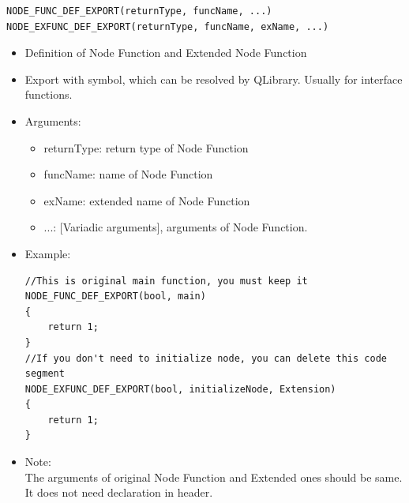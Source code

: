 \documentclass[a4paper,10pt]{book}
\begin{document}
\begin{mdframed}
\begin{verbatim}
NODE_FUNC_DEF_EXPORT(returnType, funcName, ...)
NODE_EXFUNC_DEF_EXPORT(returnType, funcName, exName, ...)
\end{verbatim}
\begin{itemize}
 \item Definition of Node Function and Extended Node Function
 \item Export with symbol, which can be resolved by QLibrary. Usually for interface functions.
 \item Arguments:
 \begin{itemize}
  \item returnType: return type of Node Function
  \item funcName: name of Node Function
  \item exName: extended name of Node Function
  \item ...: [Variadic arguments], arguments of Node Function.
 \end{itemize}
 \item Example:
 \begin{verbatim}
//This is original main function, you must keep it
NODE_FUNC_DEF_EXPORT(bool, main)
{
    return 1;
}
//If you don't need to initialize node, you can delete this code segment
NODE_EXFUNC_DEF_EXPORT(bool, initializeNode, Extension)
{
    return 1;
}
 \end{verbatim}
 \item Note: \\ The arguments of original Node Function and Extended ones should be same. \\ It does not need declaration in header.
\end{itemize}
\end{mdframed}
\end{document}

